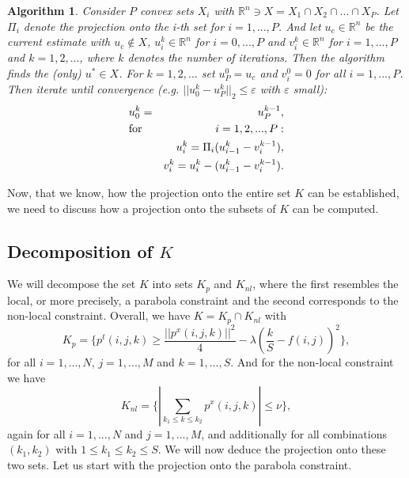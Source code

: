\documentclass{scrreprt}
\newtheorem{algorithm}[theorem]{Algorithm}
\begin{document}
            \begin{algorithm}
            \label{alg:dykstra}
                Consider $P$ convex sets $X_{i}$ with $\mathbb{R}^{n} \ni X = X_{1} \cap X_{2} \cap ... \cap X_{P}$. Let $\Pi_{i}$ denote the projection onto the i-th set for $i = 1, ..., P$. And let $u_{c} \in \mathbb{R}^{n}$ be the current estimate with $u_{c} \notin X$, $u_{i}^{k} \in \mathbb{R}^{n}$ for $i = 0, ..., P$ and $v_{i}^{k} \in \mathbb{R}^{n}$ for $i = 1, ..., P$ and $k = 1, 2, ...$, where $k$ denotes the number of iterations. Then the algorithm finds the (only) $u^{\ast} \in X$.
                For $k = 1, 2, ...$ set $u^{0}_{P} = u_{c}$ and $v^{0}_{i} = 0$ for all $i = 1, ..., P$. Then iterate until convergence (e.g. $||u_{0}^{k} - u_{P}^{k}||_{2} \le \varepsilon$ with $\varepsilon$ small):
                \begin{eqnarray}
                    &u_{0}^{k} = &u_{P}^{k-1}, \notag \\
                    &\textnormal{for} \,\, &i = 1, 2, ..., P: \notag \\
                    &&u_{i}^{k} = \Pi_{i}(u_{i-1}^{k} - v_{i}^{k-1}), \notag \\
                    &&v_{i}^{k} = u_{i}^{k} - (u_{i-1}^{k} - v_{i}^{k-1}). \notag
                \end{eqnarray}
            \end{algorithm}
            
            Now, that we know, how the projection onto the entire set $K$ can be established, we need to discuss how a projection onto the subsets of $K$ can be computed.


        \subsection{Decomposition of $K$} %
        \label{sub:decomposition_of_K}
            
            We will decompose the set $K$ into sets $K_{p}$ and $K_{nl}$, where the first resembles the local, or more precisely, a parabola constraint and the second corresponds to the non-local constraint. Overall, we have $K = K_{p} \cap K_{nl}$ with
                $$
                    K_{p} = \bigg\{ p^{t}(i, j, k) \ge \frac{||p^{x}(i, j, k)||^{2}}{4} - \lambda(\frac{k}{S} - f(i,j))^{2} \bigg\},
                $$
            for all $i = 1, ..., N$, $j = 1, ..., M$ and $k = 1, ..., S$. And for the non-local constraint we have
                $$
                    K_{nl} = \bigg\{ \left| \sum_{k_{1} \le k \le k_{2}} p^{x}(i, j, k) \right| \le \nu \bigg\},
                $$
            again for all $i = 1, ..., N$ and $j = 1, ..., M$, and additionally for all combinations $(k_{1}, k_{2})$ with $1 \le k_{1} \le k_{2} \le S$. We will now deduce the projection onto these two sets. Let us start with the projection onto the parabola constraint.
\end{document}
